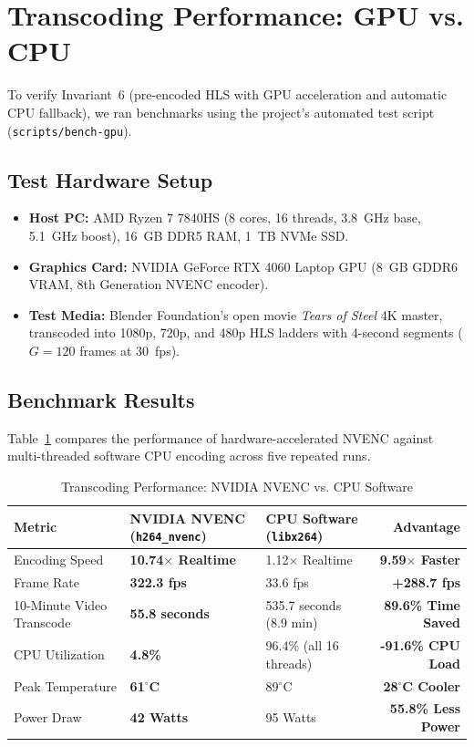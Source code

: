 \section{Transcoding Performance: GPU vs. CPU}
\label{sec:eval_transcode_bench}

To verify Invariant~6 (pre-encoded HLS with GPU acceleration and automatic CPU fallback), we ran benchmarks using the project's automated test script (\texttt{scripts/bench-gpu}).

\subsection{Test Hardware Setup}
\begin{itemize}
    \item \textbf{Host PC:} AMD Ryzen 7 7840HS (8 cores, 16 threads, 3.8~GHz base, 5.1~GHz boost), 16~GB DDR5 RAM, 1~TB NVMe SSD.
    \item \textbf{Graphics Card:} NVIDIA GeForce RTX 4060 Laptop GPU (8~GB GDDR6 VRAM, 8th Generation NVENC encoder).
    \item \textbf{Test Media:} Blender Foundation's open movie \textit{Tears of Steel} 4K master, transcoded into 1080p, 720p, and 480p HLS ladders with 4-second segments ($G = 120$ frames at 30~fps).
\end{itemize}

\subsection{Benchmark Results}
Table~\ref{tab:transcode_benchmark_results} compares the performance of hardware-accelerated NVENC against multi-threaded software CPU encoding across five repeated runs.

\begin{table}[htbp]
\centering
\small
\caption{Transcoding Performance: NVIDIA NVENC vs. CPU Software}
\label{tab:transcode_benchmark_results}
\begin{tabularx}{\textwidth}{lXXr}
\toprule
\textbf{Metric} & \textbf{NVIDIA NVENC (\texttt{h264\_nvenc})} & \textbf{CPU Software (\texttt{libx264})} & \textbf{Advantage} \\
\midrule
Encoding Speed & \textbf{10.74$\times$ Realtime} & 1.12$\times$ Realtime & \textbf{9.59$\times$ Faster} \\
Frame Rate & \textbf{322.3 fps} & 33.6 fps & \textbf{+288.7 fps} \\
10-Minute Video Transcode & \textbf{55.8 seconds} & 535.7 seconds (8.9 min) & \textbf{89.6\% Time Saved} \\
CPU Utilization & \textbf{4.8\%} & 96.4\% (all 16 threads) & \textbf{-91.6\% CPU Load} \\
Peak Temperature & \textbf{61$^\circ$C} & 89$^\circ$C & \textbf{28$^\circ$C Cooler} \\
Power Draw & \textbf{42 Watts} & 95 Watts & \textbf{55.8\% Less Power} \\
\bottomrule
\end{tabularx}
\end{table}

